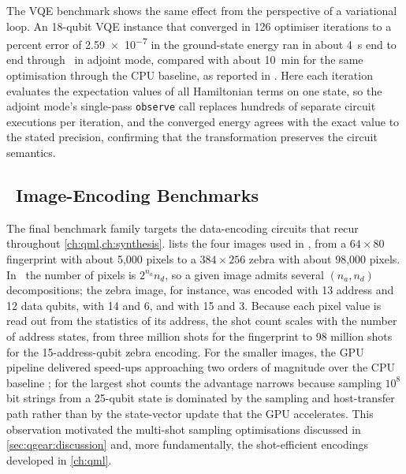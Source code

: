 The VQE benchmark shows the same effect from the perspective of a variational loop. An 18-qubit VQE instance that converged in 126 optimiser iterations to a percent error of \num{2.59e-7} in the ground-state energy ran in about \SI{4}{\second} end to end through \qgear\ in adjoint mode, compared with about \SI{10}{\minute} for the same optimisation through the CPU baseline, as reported in \cite{guo2025qgear}. Here each iteration evaluates the expectation values of all Hamiltonian terms on one state, so the adjoint mode's single-pass \texttt{observe} call replaces hundreds of separate circuit executions per iteration, and the converged energy agrees with the exact value to the stated precision, confirming that the transformation preserves the circuit semantics.

\subsection{\qcrank\ Image-Encoding Benchmarks}\label{sec:qgear:results-qcrank}

The final benchmark family targets the data-encoding circuits that recur throughout \cref{ch:qml,ch:synthesis}.  lists the four images used in \cite{guo2025qgear}, from a $64\times 80$ fingerprint with about 5,000 pixels to a $384\times 256$ zebra with about 98,000 pixels. In \qcrank\ the number of pixels is $2^{n_{a}}n_{d}$, so a given image admits several $(n_{a},n_{d})$ decompositions; the zebra image, for instance, was encoded with 13 address and 12 data qubits, with 14 and 6, and with 15 and 3. Because each pixel value is read out from the statistics of its address, the shot count scales with the number of address states, from three million shots for the fingerprint to 98 million shots for the 15-address-qubit zebra encoding. For the smaller images, the GPU pipeline delivered speed-ups approaching two orders of magnitude over the CPU baseline \cite{guo2025qgear}; for the largest shot counts the advantage narrows because sampling $10^{8}$ bit strings from a 25-qubit state is dominated by the sampling and host-transfer path rather than by the state-vector update that the GPU accelerates. This observation motivated the multi-shot sampling optimisations discussed in \cref{sec:qgear:discussion} and, more fundamentally, the shot-efficient encodings developed in \cref{ch:qml}.

